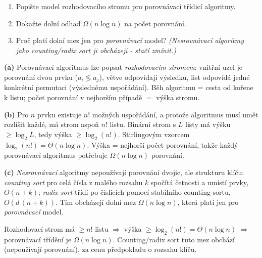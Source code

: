 \begin{zadani}
\begin{enumerate}[label=(\alph*)]
  \item {} Popište model rozhodovacího stromu pro porovnávací třídicí algoritmy.
  \item {} Dokažte dolní odhad $\Omega(n\log n)$ na počet porovnání.
  \item {} Proč platí dolní mez jen pro \emph{porovnávací} model? \emph{(Nesrovnávací algoritmy jako counting/radix sort ji obcházejí - stačí zmínit.)}
\end{enumerate}
\end{zadani}

\begin{reseni}
\textbf{(a)} Porovnávací algoritmus lze popsat \emph{rozhodovacím stromem}: vnitřní uzel je porovnání dvou prvku ($a_i\lessgtr a_j$), větve odpovídají výsledku, list odpovídá jedné konkrétní permutaci (výslednému uspořádání). Běh algoritmu = cesta od kořene k listu; počet porovnání v nejhorším případě $=$ výška stromu.

\textbf{(b)} Pro $n$ prvku existuje $n!$ možných uspořádání, a protože algoritmus musí umět rozlišit každé, má strom aspoň $n!$ listu. Binární strom s $L$ listy má výšku $\ge\log_2 L$, tedy výška $\ge\log_2(n!)$. Stirlingovým vzorcem $\log_2(n!)=\Theta(n\log n)$. Výška = nejhorší počet porovnání, takže každý porovnávací algoritmus potřebuje $\Omega(n\log n)$ porovnání.

\textbf{(c)} \emph{Nesrovnávací} algoritmy nepoužívají porovnání dvojic, ale strukturu klíču: \emph{counting sort} pro celá čísla z malého rozsahu $k$ spočítá četnosti a umístí prvky, $O(n+k)$; \emph{radix sort} třídí po číslicích pomocí stabilního counting sortu, $O(d\,(n+k))$. Tím obcházejí dolní mez $\Omega(n\log n)$, která platí jen pro \emph{porovnávací} model.
\end{reseni}

\begin{jadro}
Rozhodovací strom má $\ge n!$ listu $\Rightarrow$ výška $\ge\log_2(n!)=\Theta(n\log n)$ $\Rightarrow$ porovnávací třídění je $\Omega(n\log n)$. Counting/radix sort tuto mez obchází (nepoužívají porovnání), za cenu předpokladu o rozsahu klíču.
\end{jadro}

